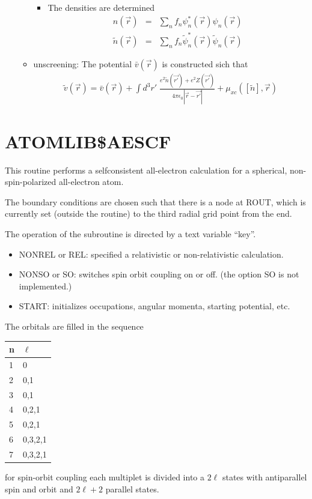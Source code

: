 \documentclass[11pt,a4paper]{report}
\begin{document}
\begin{enumerate}
\begin{itemize}
\begin{itemize}
\item The densities are determined
\begin{eqnarray*}
n(\vec{r})&=&\sum_n f_n\psi^*_n(\vec{r})\psi_n(\vec{r})
\\
\tilde{n}(\vec{r})&=&\sum_n f_n\tilde{\psi}^*_n(\vec{r})\tilde{\psi}_n(\vec{r})
\end{eqnarray*}
\end{itemize}
\item unscreening: The potential $\bar{v}(\vec{r})$ is constructed sich that
\begin{eqnarray*}
\tilde{v}(\vec{r})=\bar{v}(\vec{r})+\int d^3r'\;
\frac{e^2\tilde{n}(\vec{r'})+e^2Z(\vec{r'})}{4\pi\epsilon_0|\vec{r}-\vec{r'}|}
+\mu_{xc}([\tilde{n}],\vec{r})
\end{eqnarray*}
\end{itemize}
\end{enumerate}




\section{ATOMLIB\$AESCF}
\label{sec:atomlibaescf}
This routine performs a selfconsistent all-electron calculation for a
spherical, non-spin-polarized all-electron atom.

The boundary conditions are chosen such that there is a node at ROUT,
which is currently set (outside the routine) to the third radial grid
point from the end.

The operation of the subroutine is directed by a text variable ``key''.
\begin{itemize}
\item NONREL or REL: specified a relativistic or non-relativistic
  calculation.
\item NONSO or SO: switches spin orbit coupling on or off. (the option
  SO is not implemented.)
\item START: initializes occupations, angular momenta, starting
  potential, etc.
\end{itemize}

The orbitals are filled in the sequence
\begin{center}
\begin{tabular}{|l|l|}
\hline
n & $\ell$\\
\hline
1 & 0 \\
2 & 0,1\\
3 & 0,1 \\
4 & 0,2,1 \\
5 & 0,2,1 \\
6 & 0,3,2,1 \\
7 & 0,3,2,1\\
\hline
\end{tabular}
\end{center}
for spin-orbit coupling each multiplet is divided into a $2\ell$
states with antiparallel spin and orbit and $2\ell+2$ parallel states.
\end{document}
